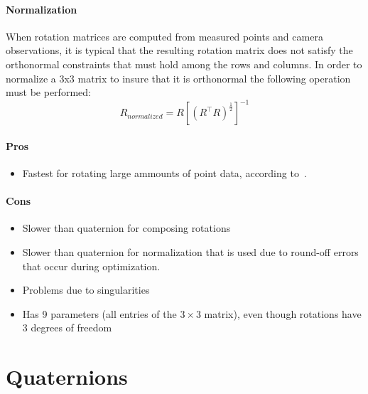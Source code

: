 \paragraph{Normalization}
When rotation matrices are computed from measured points and camera
observations, it is typical that the resulting rotation matrix does not
satisfy the orthonormal constraints that must hold among the rows and columns.
In order to normalize a 3x3 matrix to insure that it is orthonormal the following operation must be performed:
\begin{equation}\label{eq:r:normalized}
R_{normalized} = R\left[ \left( R^\top R \right)^{\frac{1}{2}}
\right]^{-1}
\end{equation}


\paragraph{Pros}
\begin{itemize}
\item Fastest for rotating large ammounts
of point data, according to~\cite{Schneider:Geometry:book:2003}.
\end{itemize}
\paragraph{Cons}
\begin{itemize}
\item Slower than quaternion for composing rotations
\item Slower than quaternion for normalization that is used due to round-off errors that
occur during optimization. 
\item Problems due to singularities
\item Has 9 parameters (all entries of the $3\times 3$ matrix), even though rotations have 3 degrees of freedom
\end{itemize}

\section{Quaternions}


